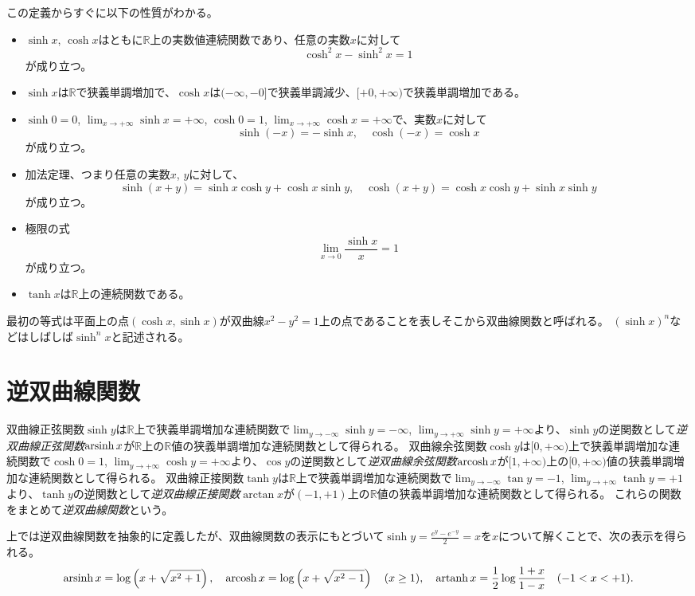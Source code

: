 この定義からすぐに以下の性質がわかる。
\begin{itemize}
\item
$\sinh x$, $\cosh x$はともに$\mathbb{R}$上の実数値連続関数であり、任意の実数$x$に対して
$$
\cosh^2 x-\sinh^2 x = 1
$$
が成り立つ。
\item
$\sinh x$は$\mathbb{R}$で狭義単調増加で、$\cosh x$は$(-\infty, -0]$で狭義単調減少、$[+0, +\infty)$で狭義単調増加である。
\item
$\sinh 0 = 0$, $\lim_{x \to +\infty}\sinh x = +\infty$, $\cosh 0 = 1$, $\lim_{x \to +\infty}\cosh x = +\infty$で、実数$x$に対して
$$
\sinh(-x) = -\sinh x, \quad \cosh(-x) = \cosh x
$$
が成り立つ。
\item
加法定理、つまり任意の実数$x$, $y$に対して、
$$
\sinh(x+y) = \sinh x\cosh y+\cosh x\sinh y,
\quad \cosh(x+y) = \cosh x\cosh y+\sinh x\sinh y
$$
が成り立つ。
\item
極限の式
$$
\lim_{x \to 0}\frac{\sinh x}{x} = 1
$$
が成り立つ。
\item
$\tanh x$は$\mathbb{R}$上の連続関数である。
\end{itemize}
最初の等式は平面上の点$(\cosh x, \sinh x)$が双曲線$x^2-y^2 = 1$上の点であることを表しそこから双曲線関数と呼ばれる。
$(\sinh x)^n$などはしばしば$\sinh^n x$と記述される。

\section{逆双曲線関数}

双曲線正弦関数$\sinh y$は$\mathbb{R}$上で狭義単調増加な連続関数で$\lim_{y \to -\infty}\sinh y = -\infty$, $\lim_{y \to +\infty}\sinh y = +\infty$より、$\sinh y$の逆関数として\emph{逆双曲線正弦関数}$\operatorname{arsinh} x$が$\mathbb{R}$上の$\mathbb{R}$値の狭義単調増加な連続関数として得られる。
双曲線余弦関数$\cosh y$は$[0, +\infty)$上で狭義単調増加な連続関数で$\cosh 0 = 1$, $\lim_{y \to +\infty}\cosh y = +\infty$より、$\cos y$の逆関数として\emph{逆双曲線余弦関数}$\operatorname{arcosh} x$が$[1, +\infty)$上の$[0, +\infty)$値の狭義単調増加な連続関数として得られる。
双曲線正接関数$\tanh y$は$\mathbb{R}$上で狭義単調増加な連続関数で$\lim_{y \to -\infty}\tan y = -1$, $\lim_{y \to +\infty}\tanh y = +1$より、$\tanh y$の逆関数として\emph{逆双曲線正接関数}$\arctan x$が$(-1, +1)$上の$\mathbb{R}$値の狭義単調増加な連続関数として得られる。
これらの関数をまとめて\emph{逆双曲線関数}という。

上では逆双曲線関数を抽象的に定義したが、双曲線関数の表示にもとづいて$\sinh y = \frac{e^y-e^{-y}}{2} = x$を$x$について解くことで、次の表示を得られる。
$$
\operatorname{arsinh} x = \log\left(x+\sqrt{x^2+1}\right),
\quad \operatorname{arcosh} x = \log\left(x+\sqrt{x^2-1}\right) \quad (x \ge 1),
\quad \operatorname{artanh} x = \frac{1}{2}\log\frac{1+x}{1-x} \quad (-1 < x < +1).
$$

